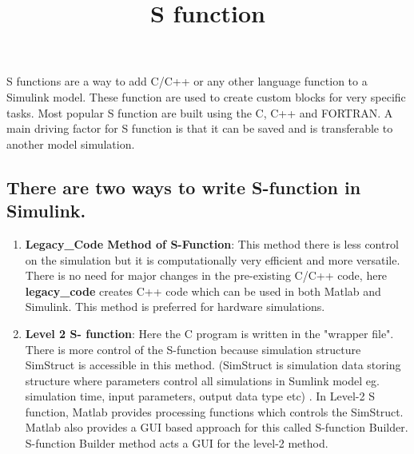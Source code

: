 \documentclass{article}
\title{S function}
\date{}
\begin{document}
\maketitle
S functions are a way to add C/C++ or any other language function to a Simulink model. These function are used to create custom blocks for very specific tasks. Most popular S function are built using the C, C++ and FORTRAN. A main driving factor for S function is that it can be saved and is transferable to another model simulation.
\subsection{There are two ways to write S-function in Simulink.}
\begin{enumerate}
    \item \textbf{Legacy\_Code Method of S-Function}: This method there is less control on the simulation but it is computationally very efficient and more versatile. There is no need for major changes in the pre-existing C/C++ code, here \textbf{legacy\_code} creates C\C++ code which can be used in both Matlab and Simulink. This method is preferred for hardware simulations.




    \item \textbf{Level 2 S- function}: Here the C program is written in the "wrapper file". There is more control of the S-function because simulation structure SimStruct is accessible in this method. (SimStruct is simulation data storing structure where parameters control all simulations in Sumlink model eg. simulation time, input parameters, output data type etc) . In Level-2 S function, Matlab provides processing functions which controls the SimStruct. Matlab also provides a GUI based approach for this called S-function Builder. S-function Builder method acts a GUI for the level-2 method. 



\end{enumerate}
\end{document}
